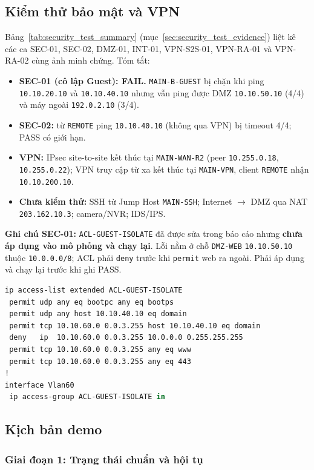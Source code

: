 \subsection{Kiểm thử bảo mật và VPN}
Bảng~\ref{tab:security_test_summary} (mục~\ref{sec:security_test_evidence}) liệt kê các ca SEC-01, SEC-02, DMZ-01, INT-01, VPN-S2S-01, VPN-RA-01 và VPN-RA-02 cùng ảnh minh chứng. Tóm tắt:
\begin{itemize}[noitemsep,topsep=2pt]
    \item \textbf{SEC-01 (cô lập Guest): FAIL.} \texttt{MAIN-B-GUEST} bị chặn khi ping \texttt{10.10.20.10} và \texttt{10.10.40.10} nhưng vẫn ping được DMZ \texttt{10.10.50.10} (4/4) và máy ngoài \texttt{192.0.2.10} (3/4).
    \item \textbf{SEC-02:} từ \texttt{REMOTE} ping \texttt{10.10.40.10} (không qua VPN) bị timeout 4/4; PASS có giới hạn.
    \item \textbf{VPN:} IPsec site-to-site kết thúc tại \texttt{MAIN-WAN-R2} (peer \texttt{10.255.0.18}, \texttt{10.255.0.22}); VPN truy cập từ xa kết thúc tại \texttt{MAIN-VPN}, client \texttt{REMOTE} nhận \texttt{10.10.200.10}.
    \item \textbf{Chưa kiểm thử:} SSH từ Jump Host \texttt{MAIN-SSH}; Internet $\to$ DMZ qua NAT \texttt{203.162.10.3}; camera/NVR; IDS/IPS.
\end{itemize}
\noindent \textbf{Ghi chú SEC-01:} \texttt{ACL-GUEST-ISOLATE} đã được sửa trong báo cáo nhưng \textbf{chưa áp dụng vào mô phỏng và chạy lại}. Lỗi nằm ở chỗ \texttt{DMZ-WEB} \texttt{10.10.50.10} thuộc \texttt{10.0.0.0/8}; ACL phải \texttt{deny} trước khi \texttt{permit} web ra ngoài. Phải áp dụng và chạy lại trước khi ghi PASS.
\begin{lstlisting}[language=csh,caption={ACL-GUEST-ISOLATE đã sửa (chưa áp dụng vào mô phỏng)}]
ip access-list extended ACL-GUEST-ISOLATE
 permit udp any eq bootpc any eq bootps
 permit udp any host 10.10.40.10 eq domain
 permit tcp 10.10.60.0 0.0.3.255 host 10.10.40.10 eq domain
 deny   ip  10.10.60.0 0.0.3.255 10.0.0.0 0.255.255.255
 permit tcp 10.10.60.0 0.0.3.255 any eq www
 permit tcp 10.10.60.0 0.0.3.255 any eq 443
!
interface Vlan60
 ip access-group ACL-GUEST-ISOLATE in
\end{lstlisting}

\subsection{Kịch bản demo}

\subsubsection{Giai đoạn 1: Trạng thái chuẩn và hội tụ}

